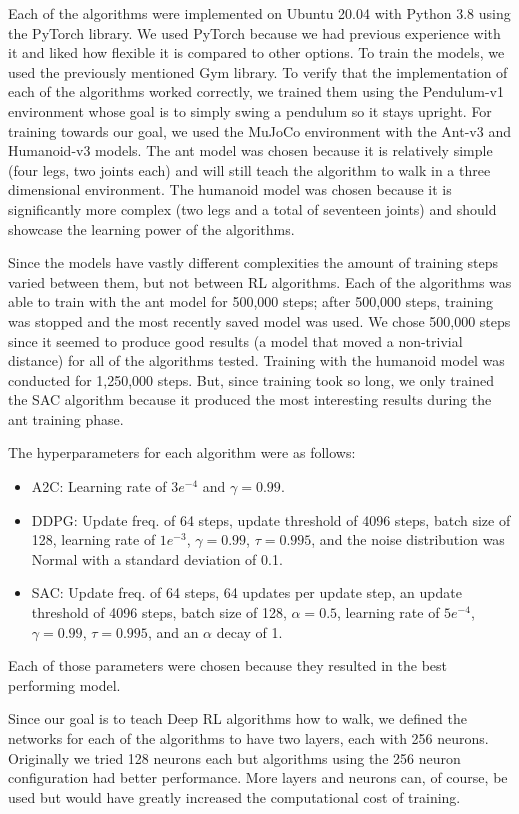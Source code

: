 \documentclass[conference]{IEEEtran}
\begin{document}
Each of the algorithms were implemented on Ubuntu 20.04 with Python 3.8 using the PyTorch library. We used PyTorch
because we had previous experience with it and liked how flexible it is compared to other options. To train the models,
we used the previously mentioned Gym library. To verify that the implementation of each of the algorithms worked
correctly, we trained them using the Pendulum-v1 environment whose goal is to simply swing a pendulum so it stays
upright. For training towards our goal, we used the MuJoCo environment with the Ant-v3 and Humanoid-v3 models. The ant
model was chosen because it is relatively simple (four legs, two joints each) and will still teach the algorithm to walk
in a three dimensional environment. The humanoid model was chosen because it is significantly more complex (two legs and
a total of seventeen joints) and should showcase the learning power of the algorithms.

Since the models have vastly different complexities the amount of training steps varied between them, but not between RL
algorithms. Each of the algorithms was able to train with the ant model for 500,000 steps; after 500,000 steps, training
was stopped and the most recently saved model was used. We chose 500,000 steps since it seemed to produce good results
(a model that moved a non-trivial distance) for all of the algorithms tested. Training with the humanoid model was
conducted for 1,250,000 steps. But, since training took so long, we only trained the SAC algorithm because it produced
the most interesting results during the ant training phase.

The hyperparameters for each algorithm were as follows:
\begin{itemize}
    \item A2C: Learning rate of $3e^{-4}$ and $\gamma = 0.99$.
    \item DDPG: Update freq. of 64 steps, update threshold of 4096 steps, batch size of 128, learning rate of $1e^{-3}$,
    $\gamma = 0.99$, $\tau = 0.995$, and the noise distribution was Normal with a standard deviation of 0.1.
    \item SAC: Update freq. of 64 steps, 64 updates per update step, an update threshold of 4096 steps, batch size of
    128, $\alpha = 0.5$, learning rate of $5e^{-4}$, $\gamma = 0.99$, $\tau = 0.995$, and an $\alpha$ decay of 1.
\end{itemize}
Each of those parameters were chosen because they resulted in the best performing model.

Since our goal is to teach Deep RL algorithms how to walk, we defined the networks for each of the algorithms to have
two layers, each with 256 neurons. Originally we tried 128 neurons each but algorithms using the 256 neuron
configuration had better performance. More layers and neurons can, of course, be used but would have greatly increased
the computational cost of training.
\end{document}
